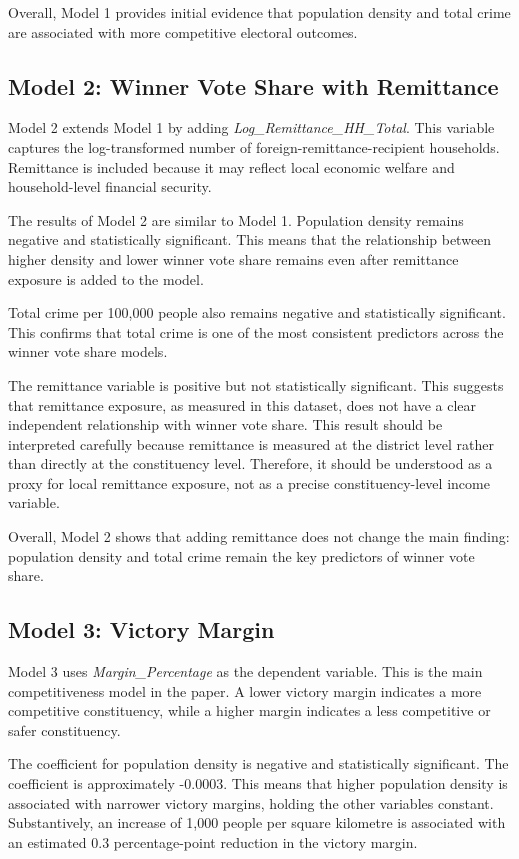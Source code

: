 \documentclass[12pt,a4paper]{article}
\begin{document}
Overall, Model 1 provides initial evidence that population density and total crime are associated with more competitive electoral outcomes.

\subsection{Model 2: Winner Vote Share with Remittance}

Model 2 extends Model 1 by adding \textit{Log\_Remittance\_HH\_Total}. This variable captures the log-transformed number of foreign-remittance-recipient households. Remittance is included because it may reflect local economic welfare and household-level financial security.

The results of Model 2 are similar to Model 1. Population density remains negative and statistically significant. This means that the relationship between higher density and lower winner vote share remains even after remittance exposure is added to the model.

Total crime per 100,000 people also remains negative and statistically significant. This confirms that total crime is one of the most consistent predictors across the winner vote share models.

The remittance variable is positive but not statistically significant. This suggests that remittance exposure, as measured in this dataset, does not have a clear independent relationship with winner vote share. This result should be interpreted carefully because remittance is measured at the district level rather than directly at the constituency level. Therefore, it should be understood as a proxy for local remittance exposure, not as a precise constituency-level income variable.

Overall, Model 2 shows that adding remittance does not change the main finding: population density and total crime remain the key predictors of winner vote share.

\subsection{Model 3: Victory Margin}

Model 3 uses \textit{Margin\_Percentage} as the dependent variable. This is the main competitiveness model in the paper. A lower victory margin indicates a more competitive constituency, while a higher margin indicates a less competitive or safer constituency.

The coefficient for population density is negative and statistically significant. The coefficient is approximately -0.0003. This means that higher population density is associated with narrower victory margins, holding the other variables constant. Substantively, an increase of 1,000 people per square kilometre is associated with an estimated 0.3 percentage-point reduction in the victory margin.
\end{document}
